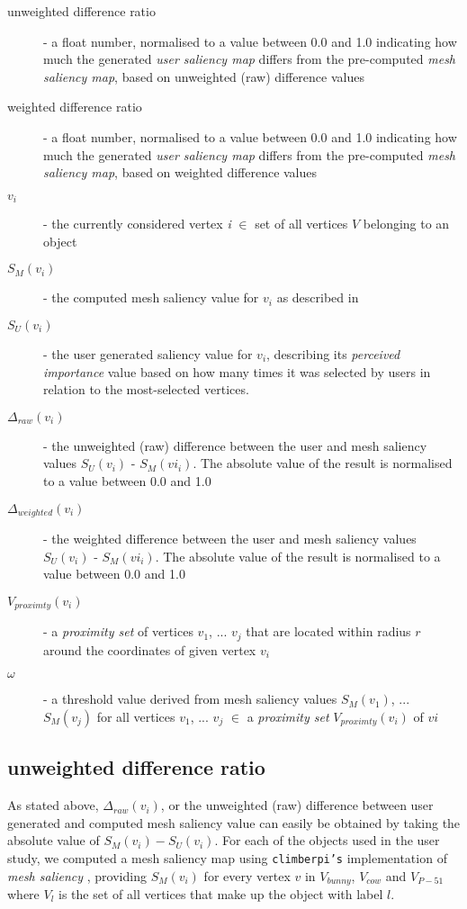 \begin{description}
	\item[unweighted difference ratio] - a float number, normalised to a value between 0.0 and 1.0 indicating how much the generated \textit{user saliency map} differs from the pre-computed \textit{mesh saliency map}, based on unweighted (raw) difference values
	\item[weighted difference ratio] - a float number, normalised to a value between 0.0 and 1.0 indicating how much the generated \textit{user saliency map} differs from the pre-computed \textit{mesh saliency map}, based on weighted difference values
	\item[$v_i$] - the currently considered vertex \textit{i} $\in$ set of all vertices $V$ belonging to an object
	\item[$S_{M}(v_i)$] - the computed mesh saliency value for $v_i$ as described in \cite{lee2005mesh}
	\item[$S_{U}(v_i)$] - the user generated saliency value for $v_i$, describing its \textit{perceived importance} value based on how many times it was selected by users in relation to the most-selected vertices.
	\item[$\Delta_{raw}(v_i)$] - the unweighted (raw) difference between the user and mesh saliency values $S_{U}(v_i)$ - $S_{M}(vi_i)$. The absolute value of the result is normalised to a value between 0.0 and 1.0
	\item[$\Delta_{weighted}(v_i)$] - the weighted difference between the user and mesh saliency values $S_{U}(v_i)$ - $S_{M}(vi_i)$. The absolute value of the result is normalised to a value between 0.0 and 1.0
	\item[$V_{proximty}(v_i)$] - a \textit{proximity set} of vertices $v_1$, ... $v_j$ that are located within radius $r$ around the coordinates of given vertex $v_i$
	\item[$\omega$] - a threshold value derived from mesh saliency values $S_{M}(v_1)$, ... $S_{M}(v_j)$ for all vertices $v_1$, ... $v_j$ $\in$ a \textit{proximity set} $V_{proximty}(v_i)$ of $vi$
\end{description}

		\subsection{unweighted difference ratio}
		\label{sec:unweighted_difference_ratio}
As stated above, $\Delta_{raw}(v_i)$, or the unweighted (raw) difference between user generated and computed mesh saliency value can easily be obtained by taking the absolute value of $S_{M}(v_i) - S_{U}(v_i)$. For each of the objects used in the user study, we computed a mesh saliency map using \texttt{climberpi's} implementation of \textit{mesh saliency} \cite{clms}, providing $S_{M}(v_i)$ for every vertex $v$ in $V_{bunny}$, $V_{cow}$ and $V_{P-51}$ where $V_{l}$ is the set of all vertices that make up the object with label $l$.

